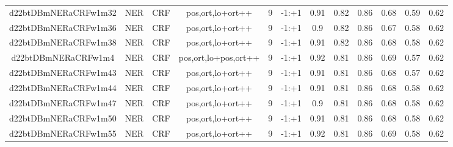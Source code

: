 \documentclass[a4paper]{article}
\begin{document}
\begin{landscape}
\begin{center}
\begin{tabular}{ |c|c|c|c|c|c|c|c|c|c|c|c|}
 	
 
 	
 		
 		\small{ d22btDBmNERaCRFw1m32 } & NER & CRF & pos,ort,lo+ort++  &  9 &  -1:+1  &  0.91 & 0.82 & 0.86  &  0.68 & 0.59 & 0.62 \\
 		

 	
 
 	
 		
 		\small{ d22btDBmNERaCRFw1m36 } & NER & CRF & pos,ort,lo+ort++  &  9 &  -1:+1  &  0.9 & 0.82 & 0.86  &  0.67 & 0.58 & 0.62 \\
 		

 	
 
 	
 		
 		\small{ d22btDBmNERaCRFw1m38 } & NER & CRF & pos,ort,lo+ort++  &  9 &  -1:+1  &  0.91 & 0.82 & 0.86  &  0.68 & 0.58 & 0.62 \\
 		

 	
 
 	
 		
 		\small{ d22btDBmNERaCRFw1m4 } & NER & CRF & pos,ort,lo+pos,ort++  &  9 &  -1:+1  &  0.92 & 0.81 & 0.86  &  0.69 & 0.57 & 0.62 \\
 		

 	
 
 	
 		
 		\small{ d22btDBmNERaCRFw1m43 } & NER & CRF & pos,ort,lo+ort++  &  9 &  -1:+1  &  0.91 & 0.81 & 0.86  &  0.68 & 0.57 & 0.62 \\
 		

 	
 
 	
 		
 		\small{ d22btDBmNERaCRFw1m44 } & NER & CRF & pos,ort,lo+ort++  &  9 &  -1:+1  &  0.91 & 0.81 & 0.86  &  0.68 & 0.58 & 0.62 \\
 		

 	
 
 	
 		
 		\small{ d22btDBmNERaCRFw1m47 } & NER & CRF & pos,ort,lo+ort++  &  9 &  -1:+1  &  0.9 & 0.81 & 0.86  &  0.68 & 0.58 & 0.62 \\
 		

 	
 
 	
 		
 		\small{ d22btDBmNERaCRFw1m50 } & NER & CRF & pos,ort,lo+ort++  &  9 &  -1:+1  &  0.91 & 0.81 & 0.86  &  0.68 & 0.58 & 0.62 \\
 		

 	
 
 	
 		
 		\small{ d22btDBmNERaCRFw1m55 } & NER & CRF & pos,ort,lo+ort++  &  9 &  -1:+1  &  0.92 & 0.81 & 0.86  &  0.69 & 0.58 & 0.62 \\
 		


\end{tabular}
\end{center}
\end{landscape}
\end{document}
